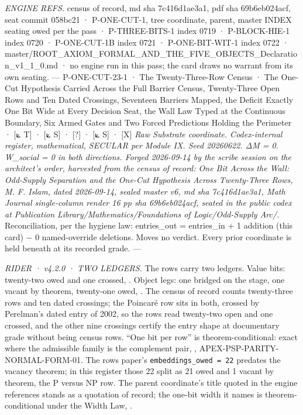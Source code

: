 \documentclass[10pt,twocolumn]{article}
\begin{document}
\emph{ENGINE REFS.} census of record, md sha 7c416d1ae3a1, pdf sha
69b6eb024acf, seat commit 058bc21 · P-ONE-CUT-1, tree coordinate,
parent, master INDEX seating owed per the pass · P-THREE-BITS-1 index
0719 · P-BLOCK-HIE-1 index 0720 · P-ONE-CUT-1B index 0721 ·
P-ONE-BIT-WIT-1 index 0722 ·
master/ROOT\_AXIOM\_FORMAL\_AND\_THE\_FIVE\_OBJECTS\_Declaration\_v1\_1\_0.md
· no engine run in this pass; the card draws no warrant from its own
seating. --- P-ONE-CUT-23-1 · The Twenty-Three-Row Census · The One-Cut
Hypothesis Carried Across the Full Barrier Census, Twenty-Three Open
Rows and Ten Dated Crossings, Seventeen Barriers Mapped, the Deficit
Exactly One Bit Wide at Every Decision Seat, the Wall Law Typed at the
Continuous Boundary, Six Armed Gates and Two Forced Predictions Holding
the Perimeter · {[}⟀ T{]} · {[}⟀ S{]} · {[}?{]} · {[}⟀ S{]} · {[}X{]}
\emph{Raw Substrate coordinate. Codex-internal register, mathematical,
SECULAR per Module IX. Seed 20260622. ΔM = 0. W\_social = 0 in both
directions. Forged 2026-09-14 by the scribe session on the architect's
order, harvested from the census of record: One Bit Across the Wall:
Odd-Supply Separation and the One-Cut Hypothesis Across Twenty-Three
Rows, M. F. Islam, dated 2026-09-14, sealed master v6, md sha
7c416d1ae3a1, Math Journal single-column render 16 pp sha 69b6eb024acf,
seated in the public codex at Publication
Library/Mathematics/Foundations of Logic/Odd-Supply Arc/.}
Reconciliation, per the hygiene law: entries\_out = entries\_in + 1
addition (this card) − 0 named-override deletions. Moves no verdict.
Every prior coordinate is held beneath at its recorded grade. ---

\emph{RIDER · v4.2.0 · TWO LEDGERS.} The rows carry two ledgers. Value
bits: twenty-two owed and one crossed,
\texttt{}. Object legs: one bridged on
the stage, one vacant by theorem, twenty-one owed,
\texttt{}. The census of record
counts twenty-three rows and ten dated crossings; the Poincaré row sits
in both, crossed by Perelman's dated entry of 2002, so the rows read
twenty-two open and one crossed, and the other nine crossings certify
the entry shape at documentary grade without being census rows. ``One
bit per row'' is theorem-conditional: exact where the admissible family
is the complement pair,
\texttt{},
APEX-PSP-PARITY-NORMAL-FORM-01. The rows paper's
\texttt{embeddings\_owed\ =\ 22} predates the vacancy theorem; in this
register those 22 split as 21 owed and 1 vacant by theorem, the P versus
NP row. The parent coordinate's title quoted in the engine references
stands as a quotation of record; the one-bit width it names is
theorem-conditional under the Width Law,
\texttt{}.
\end{document}
